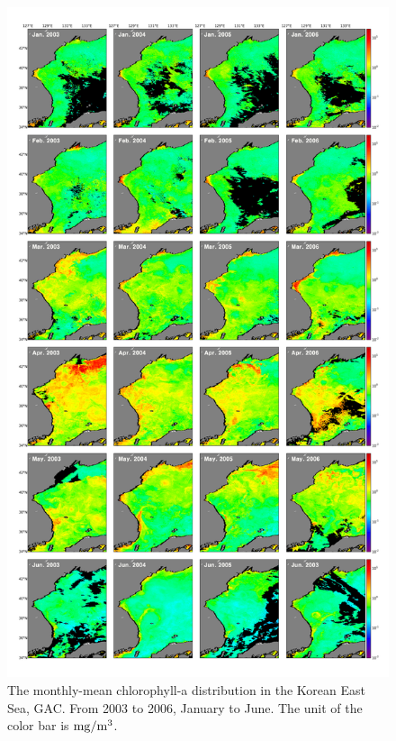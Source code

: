 \begin{figure}
	\centering
	\includegraphics[width=0.8\linewidth]{../images/noname03}
	\caption{The monthly-mean chlorophyll-a distribution in the Korean East Sea, GAC. From 2003 to 2006, January to June. The unit of the color bar is $\rm mg/m^3$.}
	\label{fig:noname03}
\end{figure}

